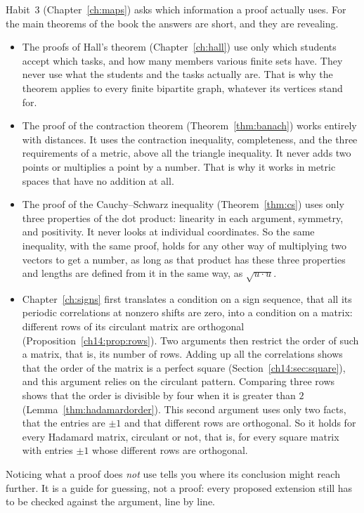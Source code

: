 Habit~3 (Chapter~\ref{ch:maps}) asks which information a proof actually uses. For the main theorems of the book the answers are short, and they are revealing.
\begin{itemize}
\item The proofs of Hall's theorem (Chapter~\ref{ch:hall}) use only which students accept which tasks, and how many members various finite sets have. They never use what the students and the tasks actually are. That is why the theorem applies to every finite bipartite graph, whatever its vertices stand for.
\item The proof of the contraction theorem (Theorem~\ref{thm:banach}) works entirely with distances. It uses the contraction inequality, completeness, and the three requirements of a metric, above all the triangle inequality. It never adds two points or multiplies a point by a number. That is why it works in metric spaces that have no addition at all.
\item The proof of the Cauchy--Schwarz inequality (Theorem~\ref{thm:cs}) uses only three properties of the dot product: linearity in each argument, symmetry, and positivity. It never looks at individual coordinates. So the same inequality, with the same proof, holds for any other way of multiplying two vectors to get a number, as long as that product has these three properties and lengths are defined from it in the same way, as $\sqrt{u\cdot u}$.
\item Chapter~\ref{ch:signs} first translates a condition on a sign sequence, that all its periodic correlations at nonzero shifts are zero, into a condition on a matrix: different rows of its circulant matrix are orthogonal (Proposition~\ref{ch14:prop:rows}). Two arguments then restrict the order of such a matrix, that is, its number of rows. Adding up all the correlations shows that the order of the matrix is a perfect square (Section~\ref{ch14:sec:square}), and this argument relies on the circulant pattern. Comparing three rows shows that the order is divisible by four when it is greater than $2$ (Lemma~\ref{thm:hadamardorder}). This second argument uses only two facts, that the entries are $\pm1$ and that different rows are orthogonal. So it holds for every Hadamard matrix, circulant or not, that is, for every square matrix with entries $\pm1$ whose different rows are orthogonal.
\end{itemize}
Noticing what a proof does \emph{not} use tells you where its conclusion might reach further. It is a guide for guessing, not a proof: every proposed extension still has to be checked against the argument, line by line.

